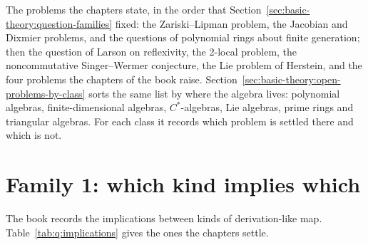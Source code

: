 The problems the chapters state, in the order that %
Section~\ref{sec:basic-theory:question-families} fixed: the %
Zariski--Lipman problem, the Jacobian and Dixmier problems, and the questions of %
polynomial rings about finite generation; then the question of Larson on reflexivity, %
the 2-local problem, the noncommutative Singer--Wermer conjecture, the Lie %
problem of Herstein, and the four problems the chapters of the book raise. %
Section~\ref{sec:basic-theory:open-problems-by-class} sorts the same list by %
where the algebra lives: polynomial algebras, finite-dimensional algebras, %
$C^{*}$-algebras, Lie algebras, prime rings and triangular algebras. %
For each class it records which problem is settled there and which is not. %

\section{Family 1: which kind implies which}

The book records the implications between kinds of derivation-like map. %
Table~\ref{tab:q:implications} gives the ones the chapters settle. %


